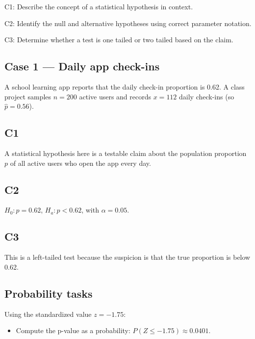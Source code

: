 



	\begin{ExamCriteria}
		\item C1: Describe the concept of a statistical hypothesis in context.
		\item C2: Identify the null and alternative hypotheses using correct parameter notation.
		\item C3: Determine whether a test is one tailed or two tailed based on the claim.
	\end{ExamCriteria}


	\begin{ExamProblems}

		\item
		\subsection*{Case 1 — Daily app check-ins}
		A school learning app reports that the daily check-in proportion is 0.62. A class project samples \(n=200\) active users and records \(x=112\) daily check-ins (so \(\hat p=0.56\)).

		\subsection*{C1}
		A statistical hypothesis here is a testable claim about the population proportion \(p\) of all active users who open the app every day.

		\subsection*{C2}
		\(H_0\colon p=0.62\), \(H_a\colon p<0.62\), with \(\alpha=0.05\).

		\subsection*{C3}
		This is a left-tailed test because the suspicion is that the true proportion is below 0.62.

		\subsection*{Probability tasks}
		Using the standardized value \(z=-1.75\):
		\begin{itemize}
			\item Compute the p-value as a probability: \(P(Z\le -1.75)\approx 0.0401\).
		\end{itemize}


\end{ExamProblems}
